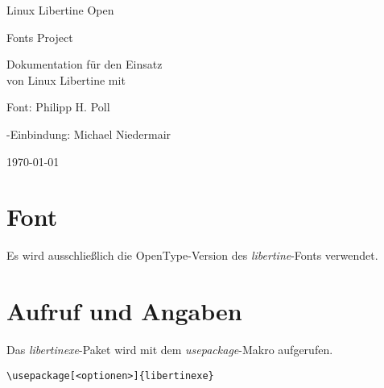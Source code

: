 \documentclass{fontdoku}
\begin{document}
\thispagestyle{empty}

\begin{minipage}{\linewidth}%
   \centering%
   \libertine\fontsize{36pt}{40pt}\selectfont%
   \textcolor{red}{}\quad%
   \fontsize{36pt}{40pt}\selectfont Linux Libertine Open\par
   \hfill\fontsize{36pt}{40pt}\selectfont Fonts Project\quad%
   \fontsize{36pt}{40pt}\selectfont\textcolor{red}{}\par
\end{minipage}

\vfill
\begin{center}
   \fontsize{26pt}{28pt}\selectfont Dokumentation für den Einsatz\\
    von Linux Libertine mit \XeLaTeX
\end{center}

\vfill
\begin{center}\fontsize{20pt}{18pt}\selectfont
Font: Philipp H. Poll\par \XeLaTeX-Einbindung: Michael Niedermair
\end{center}

\vfill
\begin{center}
{\fontsize{6cm}{6cm}\selectfont\libertineLogo}%
\hfill\fontsize{20pt}{18pt}\selectfont\today
\end{center}
\newpage
\tableofcontents
\newpage
\section{Font}

Es wird ausschließlich die OpenType-Version des \emph{libertine}-Fonts verwendet.




\section{Aufruf und Angaben}

Das \emph{libertinexe}-Paket wird mit dem \emph{usepackage}-Makro aufgerufen.

\begin{lstlisting}
\usepackage[<optionen>]{libertinexe}
\end{lstlisting}
\end{document}
